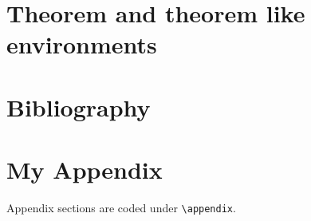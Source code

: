 \documentclass[a4paper,fleqn]{cas-dc}
\begin{document}
\section[Theorem and ...]{Theorem and theorem like environments}

\section{Bibliography}


\appendix
\section{My Appendix}
Appendix sections are coded under \verb+\appendix+.

\printcredits

%





\end{document}
